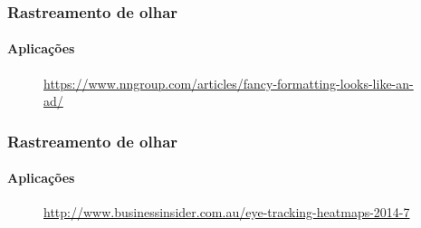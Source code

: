 \documentclass[11pt]{beamer}
\begin{document}
\begin{frame}
\frametitle{Rastreamento de olhar}
\framesubtitle{Aplicações}
\begin{figure}
	\caption{\tiny{\url{https://www.nngroup.com/articles/fancy-formatting-looks-like-an-ad/}}}
\end{figure}
\end{frame}

\begin{frame}
\frametitle{Rastreamento de olhar}
\framesubtitle{Aplicações}
\begin{figure}
	\caption{\tiny{\url{http://www.businessinsider.com.au/eye-tracking-heatmaps-2014-7}}}
\end{figure}
\end{frame}
\end{document}
